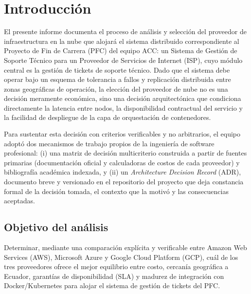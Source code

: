 \documentclass[12pt, a4paper]{article}
\begin{document}
\tableofcontents
\newpage

\section{Introducción}

El presente informe documenta el proceso de análisis y selección del proveedor de infraestructura en la nube que alojará el sistema distribuido correspondiente al Proyecto de Fin de Carrera (PFC) del equipo ACC: un Sistema de Gestión de Soporte Técnico para un Proveedor de Servicios de Internet (ISP), cuyo módulo central es la gestión de tickets de soporte técnico. Dado que el sistema debe operar bajo un esquema de tolerancia a fallos y replicación distribuida entre zonas geográficas de operación, la elección del proveedor de nube no es una decisión meramente económica, sino una decisión arquitectónica que condiciona directamente la latencia entre nodos, la disponibilidad contractual del servicio y la facilidad de despliegue de la capa de orquestación de contenedores.

Para sustentar esta decisión con criterios verificables y no arbitrarios, el equipo adoptó dos mecanismos de trabajo propios de la ingeniería de software profesional: (i) una matriz de decisión multicriterio construida a partir de fuentes primarias (documentación oficial y calculadoras de costos de cada proveedor) y bibliografía académica indexada, y (ii) un \emph{Architecture Decision Record} (ADR), documento breve y versionado en el repositorio del proyecto que deja constancia formal de la decisión tomada, el contexto que la motivó y las consecuencias aceptadas.

\subsection{Objetivo del análisis}
Determinar, mediante una comparación explícita y verificable entre Amazon Web Services (AWS), Microsoft Azure y Google Cloud Platform (GCP), cuál de los tres proveedores ofrece el mejor equilibrio entre costo, cercanía geográfica a Ecuador, garantías de disponibilidad (SLA) y madurez de integración con Docker/Kubernetes para alojar el sistema de gestión de tickets del PFC.
\end{document}
